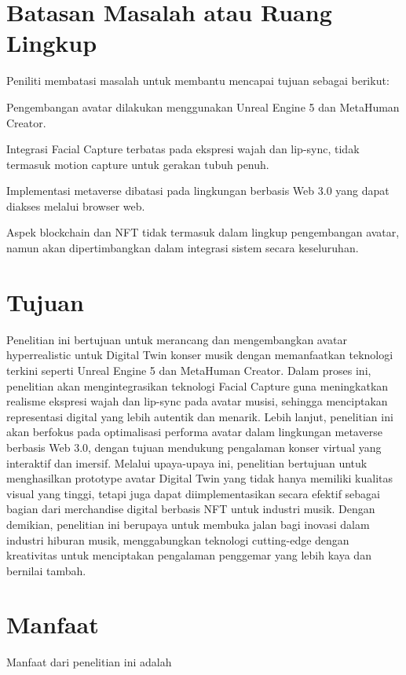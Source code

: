 \section{Batasan Masalah atau Ruang Lingkup}

Peniliti membatasi masalah untuk membantu mencapai tujuan sebagai berikut:
\\

\begin{enumarate}
\item Pengembangan avatar dilakukan menggunakan Unreal Engine 5 dan MetaHuman Creator.
\item Integrasi Facial Capture terbatas pada ekspresi wajah dan lip-sync, tidak termasuk motion capture untuk gerakan tubuh penuh.
\item Implementasi metaverse dibatasi pada lingkungan berbasis Web 3.0 yang dapat diakses melalui browser web.
\item Aspek blockchain dan NFT tidak termasuk dalam lingkup pengembangan avatar, namun akan dipertimbangkan dalam integrasi sistem secara keseluruhan.
\end{enumarate}


\section{Tujuan}

Penelitian ini bertujuan untuk merancang dan mengembangkan avatar hyperrealistic untuk Digital Twin konser musik dengan memanfaatkan
teknologi terkini seperti Unreal Engine 5 dan MetaHuman Creator. Dalam proses ini, penelitian akan mengintegrasikan teknologi Facial
Capture guna meningkatkan realisme ekspresi wajah dan lip-sync pada avatar musisi, sehingga menciptakan representasi digital yang 
lebih autentik dan menarik. Lebih lanjut, penelitian ini akan berfokus pada optimalisasi performa avatar dalam lingkungan metaverse 
berbasis Web 3.0, dengan tujuan mendukung pengalaman konser virtual yang interaktif dan imersif. Melalui upaya-upaya ini, penelitian 
bertujuan untuk menghasilkan prototype avatar Digital Twin yang tidak hanya memiliki kualitas visual yang tinggi, tetapi juga dapat 
diimplementasikan secara efektif sebagai bagian dari merchandise digital berbasis NFT untuk industri musik. Dengan demikian, 
penelitian ini berupaya untuk membuka jalan bagi inovasi dalam industri hiburan musik, menggabungkan teknologi cutting-edge dengan 
kreativitas untuk menciptakan pengalaman penggemar yang lebih kaya dan bernilai tambah.

\section{Manfaat}

Manfaat dari penelitian ini adalah \lipsum[8][1-14]
